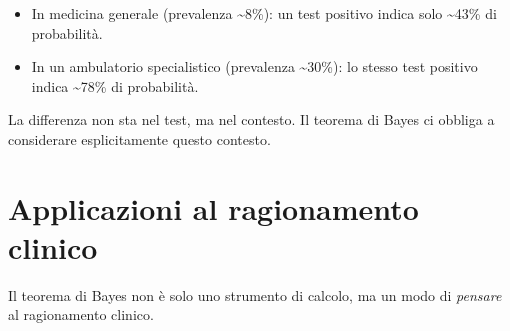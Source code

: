 \documentclass[
  italian,
  letterpaper,
  a4paper,
  11pt,
  open=any]{scrbook}
\providecommand{\tightlist}{%
  \setlength{\itemsep}{0pt}\setlength{\parskip}{0pt}}
\theoremstyle{plain}
\theoremstyle{definition}
\theoremstyle{definition}
\theoremstyle{remark}
\begin{document}
\begin{itemize}
\tightlist
\item
  In medicina generale (prevalenza \textasciitilde8\%): un test positivo
  indica solo \textasciitilde43\% di probabilità.
\item
  In un ambulatorio specialistico (prevalenza \textasciitilde30\%): lo
  stesso test positivo indica \textasciitilde78\% di probabilità.
\end{itemize}

La differenza non sta nel test, ma nel contesto. Il teorema di Bayes ci
obbliga a considerare esplicitamente questo contesto.

\section{Applicazioni al ragionamento
clinico}\label{sec-clinical-applications}

Il teorema di Bayes non è solo uno strumento di calcolo, ma un modo di
\emph{pensare} al ragionamento clinico.
\end{document}
